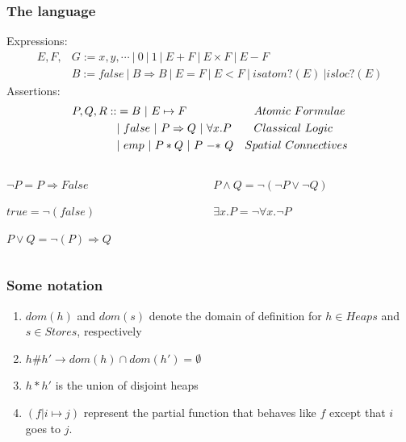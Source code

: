 \documentclass[professionalfont]{beamer}
\begin{document}
    \begin{frame}
        \frametitle{The language}
        
        Expressions:
        \begin{equation*}
            \begin{split}
            E,F,&G := x,y,\cdots\ |\ 0\ |\ 1\ |\ E + F\ |\ E \times F\ |\ E - F \\
            &B := false\ |\ B \Rightarrow B\ |\ E=F\ |\ E<F\ |\ isatom?(E)\ | isloc?(E)
            \end{split}
        \end{equation*}
    \pause
    Assertions:
     \begin{equation*}
        \begin{split}
        P,Q,R ::&= B\ |\ E \mapsto F \hspace{21mm}Atomic\ Formulae \\
            &|\ false\ |\ P \Rightarrow Q\ |\ \forall x.P \hspace{7mm}Classical\ Logic \\
            &|\ emp\  |\ P * Q\ |\ P\ {-*}\ Q \quad Spatial\ Connectives
        \end{split}      
     \end{equation*}
     
     \begin{columns}
         \begin{column}{.5\textwidth}
             \pause
             $\neg P = P \Rightarrow False$
             
             
             $true = \neg(false)$
             
             
             $P \vee Q = \neg(P) \Rightarrow Q$  
         \end{column}
         \begin{column}{.5\textwidth}
             \pause
             $P \wedge Q = \neg(\neg P \vee \neg Q)$

             $\exists x.P = \neg\forall x.\neg P$
         \end{column}
     \end{columns}
    \end{frame}
    \begin{frame}
        \frametitle{Some notation}
        \begin{enumerate}
            \item $dom(h)$ and $dom(s)$ denote the domain of definition
            for $h \in Heaps$ and $s \in Stores$, respectively
            \bigskip
            \item $h\#h' \rightarrow dom(h) \cap dom(h') = \emptyset$
            \bigskip
            \item $ h \ast h'$ is the union of disjoint heaps
            \bigskip
            \item $(f | i \mapsto j)$ represent the partial function that behaves like $f$ except that $i$ goes to $j$.
        \end{enumerate}
    \end{frame}
\end{document}
